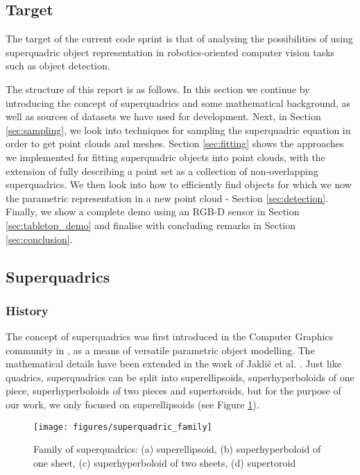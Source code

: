 \documentclass{article}
\begin{document}
\subsection {Target}
The target of the current code sprint is that of analysing the possibilities of using superquadric object representation in robotics-oriented computer vision tasks such as object detection. 

The structure of this report is as follows. In this section we continue by introducing the concept of superquadrics and some mathematical background, as well as sources of datasets we have used for development. Next, in Section \ref{sec:sampling}, we look into techniques for sampling the superquadric equation in order to get point clouds and meshes. Section \ref{sec:fitting} shows the approaches we implemented for fitting superquadric objects into point clouds, with the extension of fully describing a point set as a collection of non-overlapping superquadrics. We then look into how to efficiently find objects for which we now the parametric representation in a new point cloud - Section \ref{sec:detection}. Finally, we show a complete demo using an RGB-D sensor in Section \ref{sec:tabletop_demo} and finalise with concluding remarks in Section \ref{sec:conclusion}.


\subsection {Superquadrics}

\subsubsection*{History}
The concept of superquadrics was first introduced in the Computer Graphics community in \cite{1673799}, as a means of versatile parametric object modelling. The mathematical details have been extended in the work of Jakli\v{c} et al. \cite{SQ_2000}. Just like quadrics, superquadrics can be split into superellipsoids, superhyperboloids of one piece, superhyperboloids of two pieces and supertoroids, but for the purpose of our work, we only focused on superellipsoids (see Figure \ref{fig:superquadric_family}).

\begin{figure}
\centering
\texttt{[image: figures/superquadric\_family]}
\caption{Family of superquadrics: (a) superellipsoid, (b) superhyperboloid of one sheet, (c) superhyperboloid of two sheets, (d) supertoroid}
\label{fig:superquadric_family}
\end{figure}
\end{document}
